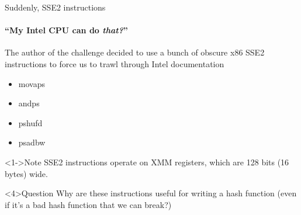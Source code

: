 \begin{frame}{Suddenly, SSE2 instructions}
    \framesubtitle{``My Intel CPU can do {\em that?}''}
    The author of the challenge decided to use a bunch of obscure x86 SSE2
    instructions to force us to trawl through Intel documentation

    \begin{itemize}
        \item<2-> movaps
        \item<2-> \alert<4->{andps}
        \item<2-> pshufd
        \item<2-> \alert<4->{psadbw}
    \end{itemize}

    \begin{block}<1->{Note}
        SSE2 instructions operate on XMM registers, which are 128 bits
        (16 bytes) wide.
    \end{block}

    \begin{alertblock}<4>{Question}
        Why are these instructions useful for writing a hash function (even if
        it's a bad hash function that we can break?)
    \end{alertblock}
\end{frame}

\newcommand{\StartCell}[2]{
    \node at (0,0) (#1) {\texttt{#2}};%
}
\newcommand{\Cell}[3]{
    \node [anchor=west] at (#1.east) (#2) {\texttt{#3}};%
}

\newcommand{\Xmm}[1]{
    \getargsC{#1}
    \begin{tikzpicture}[%
        every node/.style={%
            minimum width=1.75em,
            minimum height=1.15em,
            text height=1em,
            text depth=.15em,
            outer sep=0pt,
            draw=black,
            semithick
        }
    ]%
        \StartCell{A}{\argi}%
        \Cell{A}{B}{\argii}%
        \Cell{B}{C}{\argiii}%
        \Cell{C}{D}{\argiv}%
        \Cell{D}{E}{\argv}%
        \Cell{E}{F}{\argvi}%
        \Cell{F}{G}{\argvii}%
        \Cell{G}{H}{\argviii}%
        \Cell{H}{I}{\argix}%
        \Cell{I}{J}{\argx}%
        \Cell{J}{K}{\argxi}%
        \Cell{K}{L}{\argxii}%
        \Cell{L}{M}{\argxiii}%
        \Cell{M}{N}{\argxiv}%
        \Cell{N}{O}{\argxv}%
        \Cell{O}{P}{\argxvi}%
    \end{tikzpicture}%
}

